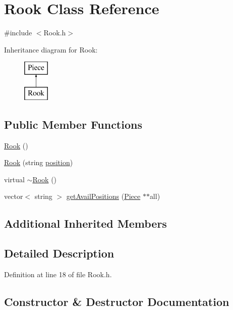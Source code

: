 \hypertarget{class_rook}{}\section{Rook Class Reference}
\label{class_rook}


{\ttfamily \#include $<$Rook.\+h$>$}

Inheritance diagram for Rook\+:\begin{figure}[H]
\begin{center}
\leavevmode
\includegraphics[height=2.000000cm]{class_rook}
\end{center}
\end{figure}
\subsection*{Public Member Functions}
\begin{DoxyCompactItemize}
\item 
\hyperlink{class_rook_a0cce560130c640f82c99937ce5781ac1}{Rook} ()
\item 
\hyperlink{class_rook_a5bb2e3899dc49bd53ba8428be36cc153}{Rook} (string \hyperlink{class_piece_a1b93d0ecc14e15fc7f3fb5def518502a}{position})
\item 
virtual \hyperlink{class_rook_a70d445b94848b22ded850b6f58bc2972}{$\sim$\+Rook} ()
\item 
vector$<$ string $>$ \hyperlink{class_rook_a96e1e49295f230cda98007a7df6d65fa}{get\+Avail\+Positions} (\hyperlink{class_piece}{Piece} $\ast$$\ast$all)
\end{DoxyCompactItemize}
\subsection*{Additional Inherited Members}


\subsection{Detailed Description}


Definition at line 18 of file Rook.\+h.



\subsection{Constructor \& Destructor Documentation}
